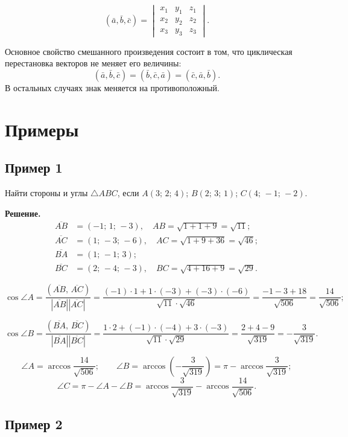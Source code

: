 \documentclass[12pt,a4paper]{article}
\newcommand{\va}{\bar{a}}
\newcommand{\vb}{\bar{b}}
\newcommand{\vc}{\bar{c}}
\begin{document}
$$
\boxed{(\va, \vb, \vc) =
  \begin{vmatrix} x_1 & y_1 & z_1 \\ x_2 & y_2 & z_2 \\ x_3 & y_3 & z_3
\end{vmatrix}.}
$$

Основное свойство смешанного произведения состоит в том, что
циклическая перестановка векторов не меняет его величины:
$$
(\va, \vb, \vc) = (\vb, \vc, \va) = (\vc, \va, \vb).
$$
В остальных случаях знак меняется на противоположный.

\section*{Примеры}

\subsection*{Пример 1}

Найти стороны и углы $\triangle ABC$, если $A(3;\,2;\,4)$;
$B(2;\,3;\,1)$; $C(4;\,-1;\,-2)$.

\textbf{Решение.}
\begin{align*}
  \overline{AB} &= (-1;\,1;\,-3), \quad AB = \sqrt{1+1+9} = \sqrt{11};\\
  \overline{AC} &= (1;\,-3;\,-6), \quad AC = \sqrt{1+9+36} = \sqrt{46};\\
  \overline{BA} &= (1;\,-1;\,3);\\
  \overline{BC} &= (2;\,-4;\,-3), \quad BC = \sqrt{4+16+9} = \sqrt{29}.
\end{align*}

$$
\cos\angle A
= \frac{(\overline{AB},\,\overline{AC})}{|\overline{AB}||\overline{AC}|}
= \frac{(-1)\cdot1 + 1\cdot(-3) + (-3)\cdot(-6)}{\sqrt{11}\cdot\sqrt{46}}
= \frac{-1-3+18}{\sqrt{506}}
= \frac{14}{\sqrt{506}};
$$

$$
\cos\angle B
= \frac{(\overline{BA},\,\overline{BC})}{|\overline{BA}||\overline{BC}|}
= \frac{1\cdot2 + (-1)\cdot(-4) + 3\cdot(-3)}{\sqrt{11}\cdot\sqrt{29}}
= \frac{2+4-9}{\sqrt{319}}
= -\frac{3}{\sqrt{319}}.
$$

$$
\angle A = \arccos\frac{14}{\sqrt{506}}; \qquad
\angle B = \arccos\!\left(-\frac{3}{\sqrt{319}}\right) = \pi -
\arccos\frac{3}{\sqrt{319}};
$$
$$
\angle C = \pi - \angle A - \angle B = \arccos\frac{3}{\sqrt{319}} -
\arccos\frac{14}{\sqrt{506}}.
$$

\subsection*{Пример 2}
\end{document}
